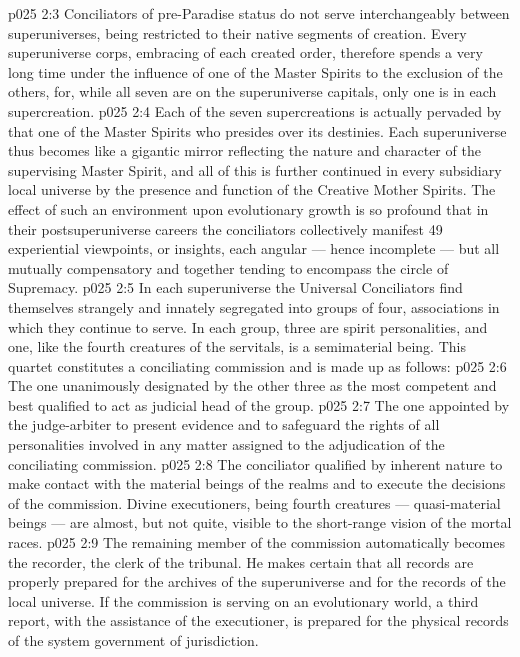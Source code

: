 \vs p025 2:3 Conciliators of pre\hyp{}Paradise status do not serve interchangeably between superuniverses, being restricted to their native segments of creation. Every superuniverse corps, embracing  of each created order, therefore spends a very long time under the influence of one of the Master Spirits to the exclusion of the others, for, while all seven are  on the superuniverse capitals, only one is  in each supercreation.
\vs p025 2:4 Each of the seven supercreations is actually pervaded by that one of the Master Spirits who presides over its destinies. Each superuniverse thus becomes like a gigantic mirror reflecting the nature and character of the supervising Master Spirit, and all of this is further continued in every subsidiary local universe by the presence and function of the Creative Mother Spirits. The effect of such an environment upon evolutionary growth is so profound that in their postsuperuniverse careers the conciliators collectively manifest 49 experiential viewpoints, or insights, each angular --- hence incomplete --- but all mutually compensatory and together tending to encompass the circle of Supremacy.
\vs p025 2:5 \pc In each superuniverse the Universal Conciliators find themselves strangely and innately segregated into groups of four, associations in which they continue to serve. In each group, three are spirit personalities, and one, like the fourth creatures of the servitals, is a semimaterial being. This quartet constitutes a conciliating commission and is made up as follows:
\vs p025 2:6 \bibnobreakspace {} The one unanimously designated by the other three as the most competent and best qualified to act as judicial head of the group.
\vs p025 2:7 \bibnobreakspace {} The one appointed by the judge\hyp{}arbiter to present evidence and to safeguard the rights of all personalities involved in any matter assigned to the adjudication of the conciliating commission.
\vs p025 2:8 \bibnobreakspace {} The conciliator qualified by inherent nature to make contact with the material beings of the realms and to execute the decisions of the commission. Divine executioners, being fourth creatures --- quasi\hyp{}material beings --- are almost, but not quite, visible to the short\hyp{}range vision of the mortal races.
\vs p025 2:9 \bibnobreakspace {} The remaining member of the commission automatically becomes the recorder, the clerk of the tribunal. He makes certain that all records are properly prepared for the archives of the superuniverse and for the records of the local universe. If the commission is serving on an evolutionary world, a third report, with the assistance of the executioner, is prepared for the physical records of the system government of jurisdiction.
